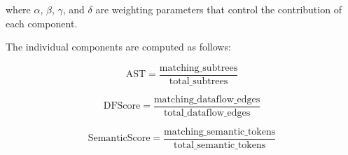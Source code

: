 where $\alpha$, $\beta$, $\gamma$, and $\delta$ are weighting parameters that control the contribution of each component.

The individual components are computed as follows:

\begin{equation}\label{eq:ast}
\text{AST} =
\frac{\text{matching\_subtrees}}{\text{total\_subtrees}}
\end{equation}

\begin{equation}\label{eq:dfscore}
\text{DFScore} =
\frac{\text{matching\_dataflow\_edges}}{\text{total\_dataflow\_edges}}
\end{equation}

\begin{equation}\label{eq:semantic}
\text{SemanticScore} =
\frac{\text{matching\_semantic\_tokens}}{\text{total\_semantic\_tokens}}
\end{equation}

